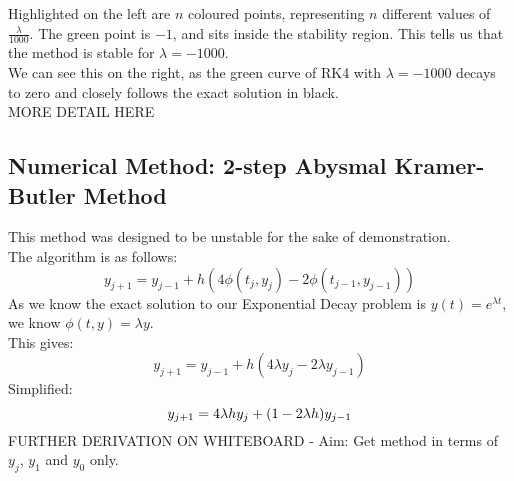 \par Highlighted on the left are $n$ coloured points, representing $n$ different values of $\frac{\lambda}{1000}$.
The green point is $-1$, and sits inside the stability region.
This tells us that the method is stable for $\lambda = -1000$.\\
We can see this on the right, as the green curve of RK4 with $\lambda = -1000$ decays to zero and closely follows the exact solution in black.\\

MORE DETAIL HERE\\


\subsection{Numerical Method: 2-step Abysmal Kramer-Butler Method}

\par This method was designed to be unstable for the sake of demonstration.\\
The algorithm is as follows:
\[y_{j+1} = y_{j-1} + h(4\phi(t_j,y_j)-2\phi(t_{j-1},y_{j-1}))\]
As we know the exact solution to our Exponential Decay problem is $y(t) = e^{\lambda t}$, we know $\phi(t,y) = \lambda y$.\\
This gives:\\
\[y_{j+1} = y_{j-1} + h(4\lambda y_j - 2\lambda y_{j-1})\]
Simplified:\\
\[y_{j+1} = 4\lambda h y_j + (1-2\lambda h) y_{j-1}\]
FURTHER DERIVATION ON WHITEBOARD - Aim: Get method in terms of $y_{j}$, $y_1$ and $y_0$ only.\\

